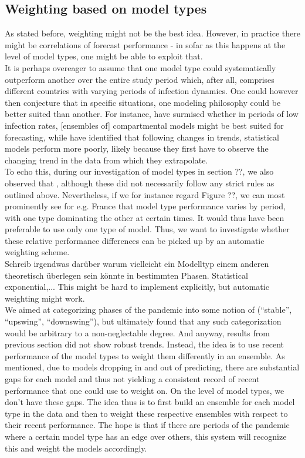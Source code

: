 \subsection{Weighting based on model types}
As stated before, weighting might not be the best idea. However, in practice there might be correlations of forecast performance - in sofar as this happens at the level of model types, one might be able to exploit that.\\
It is perhaps overeager to assume that one model type could systematically outperform another over the entire study period which, after all, comprises different countries with varying periods of infection dynamics. One could however then conjecture that in specific situations, one modeling philosophy could be better suited than another. For instance, \cite{taylor_combining_2021} have surmised whether in periods of low infection rates, [ensembles of] compartmental models might be best suited for forecasting, while \citep{bracher_pre-registered_2021} have identified that following changes in trends, statistical models perform more poorly, likely because they first have to observe the changing trend in the data from which they extrapolate.\\
To echo this, during our investigation of model types in section ??, we also observed that , although these did not necessarily follow any strict rules as outlined above. Nevertheless, if we for instance regard Figure ??, we can most prominently see for e.g. France that model type performance varies by period, with one type dominating the other at certain times. It would thus have been preferable to use only one type of model. Thus, we want to investigate whether these relative performance differences can be picked up by an automatic weighting scheme. \\
Schreib irgendwas darüber warum vielleicht ein Modelltyp einem anderen theoretisch überlegen sein könnte in bestimmten Phasen. Statistical exponential,... This might be hard to implement explicitly, but automatic weighting might work.\\
We aimed at categorizing phases of the pandemic into some notion of (``stable'', ``upswing'', ``downswing''), but ultimately found that any such categorization would be arbitrary to a non-neglectable degree. And anyway, results from previous section did not show robust trends. Instead, the idea is to use recent performance of the model types to weight them differently in an ensemble. As mentioned, due to models dropping in and out of predicting, there are substantial gaps for each model and thus not yielding a consistent record of recent performance that one could use to weight on. On the level of model types, we don't have these gaps. The idea thus is to first build an ensemble for each model type in the data and then to weight these respective ensembles with respect to their recent performance. The hope is that if there are periods of the pandemic where a certain model type has an edge over others, this system will recognize this and weight the models accordingly. \\
